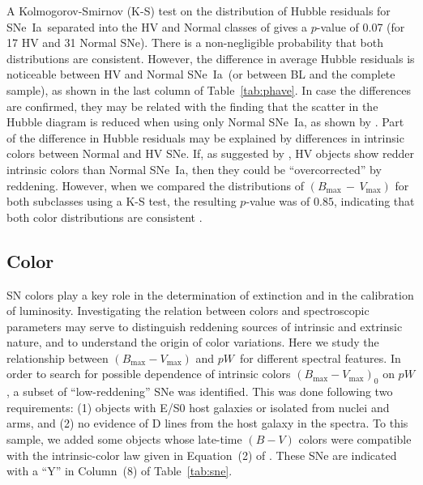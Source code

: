 \documentclass[apj]{emulateapj-rtx4}
\newcommand{\ew}{$pW$}
\newcommand{\sneia}{SNe~Ia}
\begin{document}
A Kolmogorov-Smirnov (K-S) test on the distribution of Hubble
residuals for \sneia\ separated into the HV and Normal classes of
\citet{wang09} gives a $p$-value of 0.07 (for 17 HV
and 31 Normal SNe). There is a non-negligible probability that both
distributions are consistent. However, the difference in average
Hubble residuals is noticeable between HV and Normal \sneia\ (or
between BL and the complete sample), as shown in the last column of
Table~\ref{tab:phave}. In case the differences are confirmed, they may
be related with the finding that the scatter in the Hubble diagram is
reduced when using only Normal \sneia, as shown by \citet{foley11a}.
Part of the difference in Hubble residuals may be
explained by differences in intrinsic colors between Normal and HV SNe. If,
as suggested by \citet{foley11a}, HV objects show redder intrinsic
colors than Normal \sneia, then they could be ``overcorrected'' by
reddening. However, when we compared the distributions of
$(B_{\mathrm{max}}\,-\,V_{\mathrm{max}})$ for both subclasses using a
K-S test, the resulting $p$-value was of $0.85$, indicating that both
color distributions are consistent \citep[cf.][]{foley11b}.

\subsection{Color}
\label{sec:bv}

SN colors play a key role in the determination of extinction and in
the calibration of luminosity. Investigating the relation between
colors and spectroscopic parameters may serve to distinguish reddening
sources of intrinsic and extrinsic nature, and to understand the
origin of color variations. Here we study the relationship between
$(B_{\mathrm{max}}-V_{\mathrm{max}})$ and \ew\ for different spectral
features. In order to search for possible dependence of intrinsic colors
$(B_{\mathrm{max}}-V_{\mathrm{max}})_0$ on \ew, a subset of
``low-reddening'' SNe was identified. This was done following two
requirements: (1) objects with E/S0 host galaxies or 
isolated from nuclei and arms, and (2) no evidence of
 D lines from the host galaxy in the spectra. To this
sample, we added some objects whose late-time $(B-V)$ colors were
compatible with the intrinsic-color law given in Equation~(2) of
\citet{folatelli10}. These SNe are indicated with a ``Y'' in
Column~(8) of Table~\ref{tab:sne}. 
\end{document}
